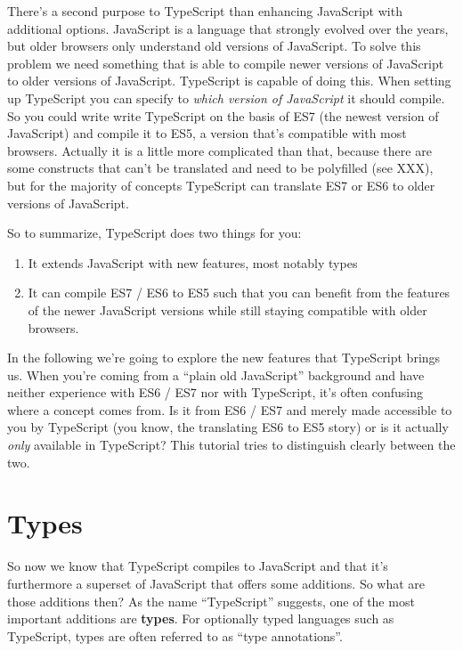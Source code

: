 \documentclass[12pt,a4paper]{report}
\begin{document}
There's a second purpose to TypeScript than enhancing JavaScript with additional options. JavaScript is a language that strongly evolved over the years, but older browsers only understand old versions of JavaScript. To solve this problem we need something that is able to compile newer versions of JavaScript to older versions of JavaScript. TypeScript is capable of doing this. When setting up TypeScript you can specify to \textit{which version of JavaScript} it should compile. So you could write write TypeScript on the basis of ES7 (the newest version of JavaScript) and compile it to ES5, a version that's compatible with most browsers. Actually it is a little more complicated than that, because there are some constructs that can't be translated and need to be polyfilled (see XXX), but for the majority of concepts TypeScript can translate ES7 or ES6 to older versions of JavaScript.

So to summarize, TypeScript does two things for you:
\begin{enumerate}
\item{It extends JavaScript with new features, most notably types}
\item{It can compile ES7 / ES6 to ES5 such that you can benefit from the features of the newer JavaScript versions while still staying compatible with older browsers.}
\end{enumerate}

In the following we're going to explore the new features that TypeScript brings us. When you're coming from a ``plain old JavaScript'' background and have neither experience with ES6 / ES7 nor with TypeScript, it's often confusing where a concept comes from. Is it from ES6 / ES7 and merely made accessible to you by TypeScript (you know, the translating ES6 to ES5 story) or is it actually \textit{only} available in TypeScript? This tutorial tries to distinguish clearly between the two.


\section{Types}

So now we know that TypeScript compiles to JavaScript and that it's furthermore a superset of JavaScript that offers some additions. So what are those additions then? As the name ``TypeScript'' suggests, one of the most important additions are \textbf{types}. For optionally typed languages such as TypeScript, types are often referred to as ``type annotations''.
\end{document}
